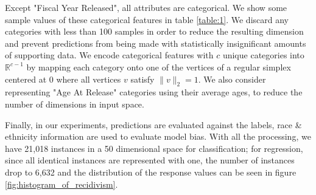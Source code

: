 \documentclass[sigconf]{acmart}
\makeatletter
\newcommand{\multilinecell}[2][c]{%
  \begin{tabular}[#1]{@{}c@{}}#2\end{tabular}}
\makeatother
\begin{document}
Except "Fiscal Year Released", all attributes are categorical. We show some sample values of these categorical features in table \ref{table:1}. We discard any categories with less than 100 samples in order to reduce the resulting dimension and prevent predictions from being made with statistically insignificant amounts of supporting data. We encode categorical features with $c$ unique categories into $\mathbb{R}^{c-1}$ by mapping each category onto one of the vertices of a regular simplex centered at 0 where all vertices $v$ satisfy $\|v\|_2 = 1$. We also consider representing "Age At Release" categories using their average ages, to reduce the number of dimensions in input space. 

Finally, in our experiments, predictions are evaluated against the labels, race \& ethnicity information are used to evaluate model bias. With all the processing, we have 21,018 instances in a 50 dimensional space for classification; for regression, since all identical instances are represented with one, the number of instances drop to 6,632 and the distribution of the response values can be seen in figure \ref{fig:histogram_of_recidivism}.






\end{document}
